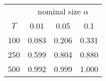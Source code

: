% 
\begin{tabular}{cccc}
  \hline
  & \multicolumn{3}{c}{nominal size $\alpha$} \\
 $T$ & 0.01 & 0.05 & 0.1 \\
 \hline
100 & 0.083 & 0.206 & 0.331 \\ 
  250 & 0.599 & 0.804 & 0.880 \\ 
  500 & 0.992 & 0.999 & 1.000 \\ 
   \hline
\end{tabular}
